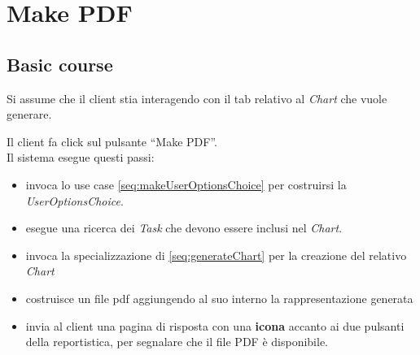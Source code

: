 \section{Make PDF}
\label{seq:commonsMakePDF}
\subsection{Basic course}
Si assume che il client stia interagendo con il tab relativo al \emph{Chart}
che vuole generare.

Il client fa click sul pulsante ``Make PDF''.\\
Il sistema esegue questi passi:
\begin{itemize}
  \item invoca lo use case \ref{seq:makeUserOptionsChoice} per costruirsi la
  \emph{UserOptionsChoice}.
  \item esegue una ricerca dei \emph{Task} che devono essere inclusi nel
  \emph{Chart}.  
  \item invoca la specializzazione di \ref{seq:generateChart} per la
  creazione del relativo \emph{Chart}
  \item costruisce un file pdf aggiungendo al suo interno la rappresentazione
  generata
  \item invia al client una pagina di risposta con una \textbf{icona} accanto ai
  due pulsanti della reportistica, per segnalare che il file PDF \`e
  disponibile.
\end{itemize}